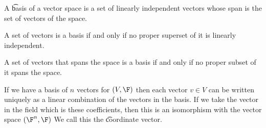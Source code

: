 
\sbasic

































\sstart
{}

A \t{basis} of a vector space is a set of linearly independent vectors whose span is the set of vectors of the space.


\begin{prop}
  A set of vectors is a basis if and only if no proper superset of it is linearly independent.
\end{prop}

\begin{prop}
  A set of vectors that spans the space is a basis if and only if no proper subset of it spans the space.
\end{prop}

If we have a basis of $n$ vectors for $(V, \F)$ then each vector $v \in V$ can be written uniquely as a linear combination of the vectors in the basis.
If we take the vector in the field which is these coefficients, then this is an isomorphism with the vector space $(\F^n, \F)$
We call this the \t{coordinate vector}.
\strats
